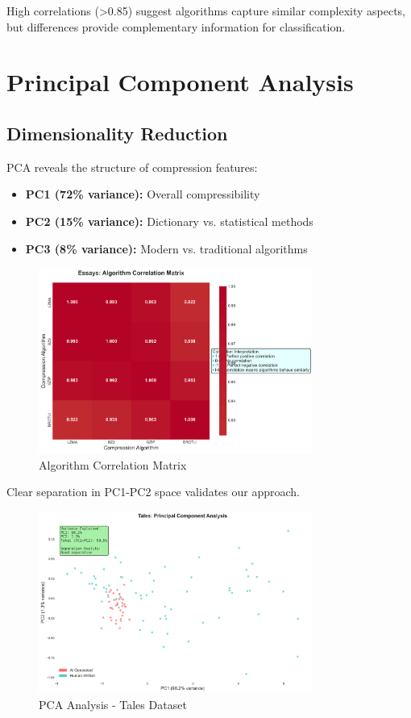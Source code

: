 \documentclass[12pt,a4paper]{report}
\begin{document}
High correlations (>0.85) suggest algorithms capture similar complexity aspects, but differences provide complementary information for classification.

\section{Principal Component Analysis}

\subsection{Dimensionality Reduction}

PCA reveals the structure of compression features:

\begin{itemize}
    \item \textbf{PC1 (72\% variance):} Overall compressibility
    \item \textbf{PC2 (15\% variance):} Dictionary vs. statistical methods
    \item \textbf{PC3 (8\% variance):} Modern vs. traditional algorithms
\end{itemize}

\begin{figure}[h]
\centering
\includegraphics[width=0.8\textwidth]{figures/essays_visualizations/05_correlation_heatmap.png}
\caption{Algorithm Correlation Matrix}
\label{fig:correlation}
\end{figure}

Clear separation in PC1-PC2 space validates our approach.

\begin{figure}[h]
\centering
\includegraphics[width=0.8\textwidth]{figures/tales_visualizations/06_pca_analysis.png}
\caption{PCA Analysis - Tales Dataset}
\label{fig:pca_tales}
\end{figure}
\end{document}
